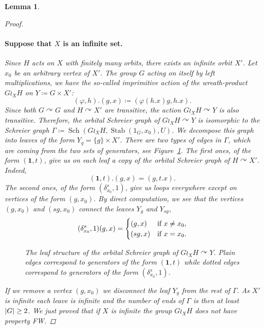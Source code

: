 \documentclass[a4paper]{article}
\newtheorem{lem}{Lemma}[section]
\theoremstyle{definition}
\theoremstyle{remark}%
\DeclareMathOperator\Sch{Sch}
\DeclareMathOperator\stab{Stab}
\DeclarePairedDelimiter\abs{\lvert}{\rvert}
\begin{document}
\begin{lem}
\begin{proof}
\paragraph{Suppose that $X$ is an infinite set.}
Since $H$ acts on $X$ with finitely many orbits, there exists an infinite orbit $X'$.
Let $x_0$ be an arbitrary vertex of $X'$.
The group $G$ acting on itself by left multiplications, we have the so-called \emph{imprimitive action} of the wreath-product $G\wr_XH$ on $Y\coloneqq G\times X'$:
\[
(\varphi,h). (g,x) \coloneqq (\varphi(h.x)g, h.x).
\]
Since both $G\curvearrowright G$ and $H\curvearrowright X'$ are transitive, the action $G\wr_XH\curvearrowright Y$ is also transitive. 
Therefore, the orbital Schreier graph of $G\wr_XH\curvearrowright Y$ is isomorphic to the Schreier graph $\Gamma\coloneqq\Sch(G\wr_XH, \stab(1_G,x_0), U)$. We decompose this graph into leaves of the form $Y_g = \{ g \} \times X'$. There are two types of edges in $\Gamma$, which are coming from the two sets of generators, see Figure~\ref{Figure:Leaves}. The first ones, of the form $(\mathbf 1,t)$, give us on each leaf a copy of the orbital Schreier graph of $H \curvearrowright X'$. Indeed,
\[
(\mathbf 1,t).(g,x) = (g, t.x).
\]
The second ones, of the form $(\delta_{x_0}^s,1)$, give us loops everywhere except on vertices of the form $(g,x_0)$. By direct computation, we see that the vertices $(g,x_0)$ and $(sg,x_0)$ connect the leaves $Y_g$ and $Y_{sg}$, 
\[
(\delta_{x_0}^s,1)(g,x) = 
\begin{cases}
(g,x) & \textnormal{if }x \neq x_0, \\
(sg, x) & \textnormal{if }x = x_0.
\end{cases}
\]
%
\begin{figure}[htbp]\centering
\scalebox{0.7}{
}
\caption{The leaf structure of the orbital Schreier graph of $G\wr_XH \curvearrowright Y$. Plain edges correspond to generators of the form $(\mathbf 1,t)$ while dotted edges correspond to generators of the form $(\delta_{x_0}^s,1)$.}
\label{Figure:Leaves}
\end{figure}
%
If we remove a vertex $(g,x_0)$ we disconnect the leaf $Y_g$ from the rest of $\Gamma$. As $X'$ is infinite each leave is infinite and the number of ends of $\Gamma$ is then at least $\abs{G}\geq 2$. We just proved that if $X$ is infinite the group $G\wr_XH$ does not have property FW.


\end{proof}
\end{lem}
\end{document}
